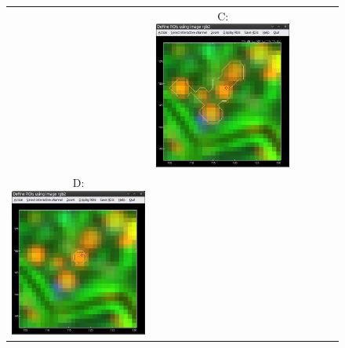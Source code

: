 \begin{figure}[!b]
\begin{tabular}{cccccc}
&
C: \includegraphics[scale=0.23]{figs3/LANS-roi-interactive2}
\\[5mm]
D: \includegraphics[scale=0.23]{figs3/LANS-roi-interactive3}

\end{tabular}
\end{figure}
